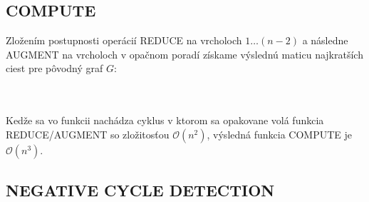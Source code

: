\documentclass[paper=a4, fontsize=11pt]{scrartcl} %
\numberwithin{equation}{section} %
\numberwithin{figure}{section} %
\numberwithin{table}{section} %
\begin{document}
\subsection*{COMPUTE}

Zložením postupnosti operácií REDUCE na vrcholoch $1 \dots (n-2)$ a následne AUGMENT na vrcholoch v opačnom poradí získame výslednú maticu najkratších ciest pre pôvodný graf $G$:\\
\ \\
\begin{algorithmic}[1]
        \EndFor
        \EndFor
        \State {}
    \EndFunction
\end{algorithmic}
\ \\
Kedže sa vo funkcii nachádza cyklus v ktorom sa opakovane volá funkcia REDUCE/AUGMENT so zložitosťou $\mathcal{O}(n^2)$, výsledná funkcia COMPUTE je $\mathcal{O}(n^3)$.

\subsection*{NEGATIVE CYCLE DETECTION}
\end{document}
